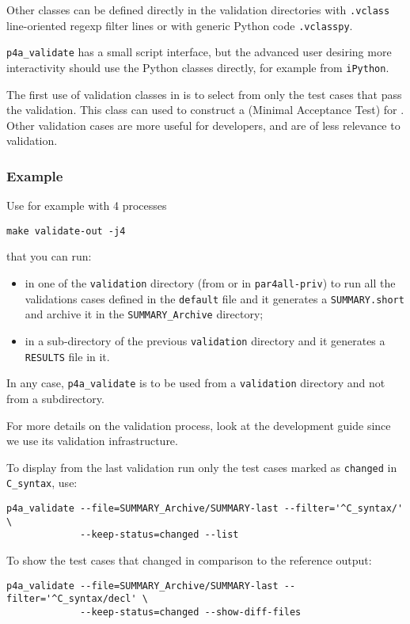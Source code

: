 \documentclass[a4paper]{article}
\begin{document}
Other classes can be defined directly in the validation
directories with \texttt{.vclass} line-oriented regexp filter lines or with
generic Python code \texttt{.vclasspy}.

\verb|p4a_validate| has a small script interface, but the advanced
user desiring more interactivity
should use the Python classes directly, for example from \texttt{iPython}.

The first use of validation classes in \Apfa is to select from \Apips
only the test cases that pass the \Apips validation. This class can used to
construct a
\Amat (Minimal Acceptance Test) for \Apfa. Other \Apips validation
cases are more useful for \Apips developers, and are of less relevance
to \Apfa validation.


\subsubsection{Example}
\label{sec:example}

Use for example with 4 processes
\begin{verbatim}
make validate-out -j4
\end{verbatim}
that you can run:
\begin{itemize}
\item in one of the \texttt{validation} directory (from \Apips or in
  \texttt{par4all-priv}) to run all the validations cases defined in the
  \texttt{default} file and it generates a \texttt{SUMMARY.short} and
  archive it in the \verb|SUMMARY_Archive| directory;
\item in a sub-directory of the previous \texttt{validation} directory and
  it generates a \texttt{RESULTS} file in it.
\end{itemize}
In any case, \verb|p4a_validate| is to be used from a \texttt{validation}
directory and not from a subdirectory.

For more details on the validation process, look at the \Apips development
guide since we use its validation infrastructure.

To display from the last validation run only the test cases marked as
\texttt{changed} in \verb|C_syntax|, use:
\begin{verbatim}
p4a_validate --file=SUMMARY_Archive/SUMMARY-last --filter='^C_syntax/' \
             --keep-status=changed --list
\end{verbatim}

To show the test cases that changed in comparison to the reference output:
\begin{verbatim}
p4a_validate --file=SUMMARY_Archive/SUMMARY-last --filter='^C_syntax/decl' \
             --keep-status=changed --show-diff-files
\end{verbatim}
\end{document}
